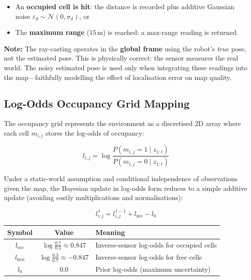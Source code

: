 \documentclass[12pt,a4paper]{article}
\begin{document}
\begin{itemize}
    \item An \textbf{occupied cell is hit}: the distance is recorded plus additive Gaussian noise \(\varepsilon_d \sim \mathcal{N}(0, \sigma_d)\), or
    \item The \textbf{maximum range} (\(15\,\text{m}\)) is reached: a max-range reading is returned.
\end{itemize}

\textbf{Note:} The ray-casting operates in the \textbf{global frame} using the robot's \emph{true} pose, not the estimated pose. This is physically correct: the sensor measures the real world. The noisy estimated pose is used only when integrating these readings into the map---faithfully modelling the effect of localisation error on map quality.

\subsection{Log-Odds Occupancy Grid Mapping}

The occupancy grid represents the environment as a discretised 2D array where each cell \(m_{i,j}\) stores the log-odds of occupancy:

\begin{equation}
    l_{i,j} = \log\frac{P(m_{i,j} = 1 \mid z_{1:t})}{P(m_{i,j} = 0 \mid z_{1:t})}
\end{equation}

Under a static-world assumption and conditional independence of observations given the map, the Bayesian update in log-odds form reduces to a simple additive update (avoiding costly multiplications and normalisations):

\begin{equation}
    l_{i,j}^{\,t} = l_{i,j}^{\,t-1} + l_{\text{inv}} - l_0
\end{equation}

\begin{table}[H]
\centering
\begin{tabular}{@{}ccp{7.5cm}@{}}
\toprule
\textbf{Symbol} & \textbf{Value} & \textbf{Meaning} \\
\midrule
\(l_{\text{occ}}\)  & \(\log\frac{0.7}{0.3} \approx 0.847\) & Inverse-sensor log-odds for occupied cells \\[4pt]
\(l_{\text{free}}\) & \(\log\frac{0.3}{0.7} \approx -0.847\) & Inverse-sensor log-odds for free cells \\[4pt]
\(l_0\)             & \(0.0\) & Prior log-odds (maximum uncertainty) \\
\bottomrule
\end{tabular}
\end{table}
\end{document}
